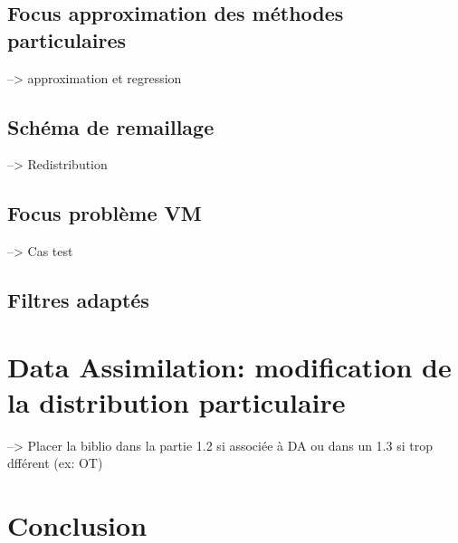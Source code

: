 \documentclass{article}
\begin{document}
\subsection{Focus approximation des méthodes particulaires}
--> approximation et regression

\subsection{Schéma de remaillage}
--> Redistribution

\subsection{Focus problème VM}
--> Cas test

\subsection{Filtres adaptés}

\section{Data Assimilation: modification de la distribution particulaire}
--> Placer la biblio dans la partie 1.2 si associée à DA ou dans un 1.3 si trop dfférent (ex: OT)

\section{Conclusion}
\end{document}
